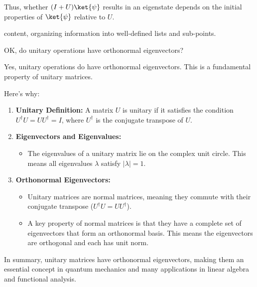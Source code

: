 \begin{airesult}
\vsp
Thus, whether \((I + U)\ket{\psi}\) results in an eigenstate depends on the initial properties of
\(\ket{\psi}\) relative to \(U\).

content, organizing information into well-defined lists and sub-points.
\end{airesult}


\begin{ai}
OK, do unitary operations have orthonormal eigenvectors?
\end{ai}

\begin{airesult}
Yes, unitary operations do have orthonormal eigenvectors. This is a fundamental property of unitary
matrices.

Here's why:

\begin{enumerate}
\item \textbf{Unitary Definition:} A matrix \(U\) is unitary if it satisfies the condition
\(U^\dagger U = UU^\dagger = I\), where \(U^\dagger\) is the conjugate transpose of \(U\).

\item \textbf{Eigenvectors and Eigenvalues:}
  \begin{itemize}
  \item The eigenvalues of a unitary matrix lie on the complex unit circle. This means all
eigenvalues \(\lambda\) satisfy \(|\lambda| = 1\).
  \end{itemize}

\item \textbf{Orthonormal Eigenvectors:}
  \begin{itemize}
  \item Unitary matrices are normal matrices, meaning they commute with their conjugate transpose
(\(U^\dagger U = UU^\dagger\)).
  \item A key property of normal matrices is that they have a complete set of eigenvectors that form
an orthonormal basis. This means the eigenvectors are orthogonal and each has unit norm.
  \end{itemize}
\end{enumerate}

In summary, unitary matrices have orthonormal eigenvectors, making them an essential concept in
quantum mechanics and many applications in linear algebra and functional analysis.
\end{airesult}


